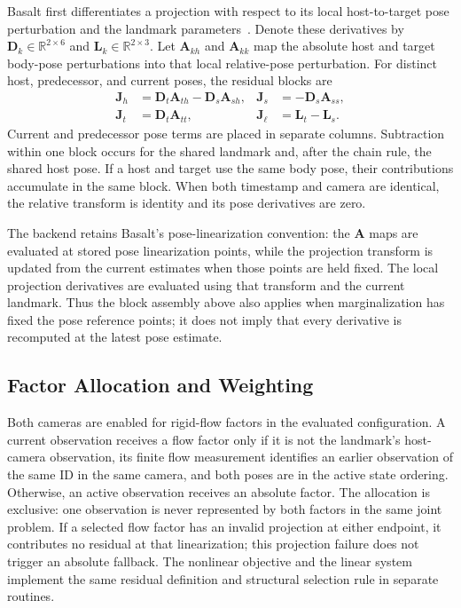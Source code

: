 Basalt first differentiates a projection with respect to its local
host-to-target pose perturbation and the landmark
parameters~\cite{usenko2020visual}. Denote these derivatives by
$\mathbf D_k\in\mathbb R^{2\times6}$ and
$\mathbf L_k\in\mathbb R^{2\times3}$.
Let $\mathbf A_{kh}$ and $\mathbf A_{kk}$ map the absolute host and target
body-pose perturbations into that local relative-pose perturbation. For
distinct host, predecessor, and current poses, the residual blocks are
\begin{equation}
  \begin{aligned}
    \mathbf J_h &= \mathbf D_t\mathbf A_{th}
                  -\mathbf D_s\mathbf A_{sh},&
    \mathbf J_s &= -\mathbf D_s\mathbf A_{ss},\\
    \mathbf J_t &= \mathbf D_t\mathbf A_{tt},&
    \mathbf J_{\ell} &= \mathbf L_t-\mathbf L_s.
  \end{aligned}
  \label{eq:rigid-flow-block-jacobians}
\end{equation}
Current and predecessor pose terms are placed in separate columns.
Subtraction within one block occurs for the shared landmark and, after the
chain rule, the shared host pose. If a host and target use the same body pose,
their contributions accumulate in the same block. When both timestamp and
camera are identical, the relative transform is identity and its pose
derivatives are zero.

The backend retains Basalt's pose-linearization convention: the
$\mathbf A$ maps are evaluated at stored pose linearization points, while the
projection transform is updated from the current estimates when those points
are held fixed. The local projection derivatives are evaluated using that
transform and the current landmark. Thus the block assembly above also applies
when marginalization has fixed the pose reference points; it does not imply
that every derivative is recomputed at the latest pose estimate.

\subsection{Factor Allocation and Weighting}

Both cameras are enabled for rigid-flow factors in the evaluated configuration.
A current observation receives a flow factor only if it is not the landmark's
host-camera observation, its finite flow measurement identifies an earlier
observation of the same ID in the same camera, and both poses are in the active
state ordering. Otherwise, an active observation receives an absolute factor.
The allocation is exclusive: one observation is never represented by both
factors in the same joint problem. If a selected flow factor has an invalid
projection at either endpoint, it contributes no residual at that
linearization; this projection failure does not trigger an absolute fallback.
The nonlinear objective and the linear system implement the same residual
definition and structural selection rule in separate routines.

